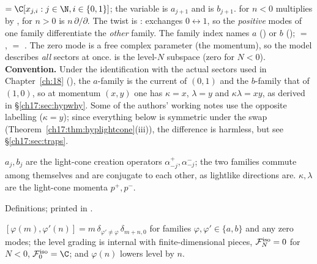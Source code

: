 \begin{dictionary}
 $=\C[x_{j,i}:j\in\N,i\in\{0,1\}]$; the variable  is $a_{j+1}$ and  is
$b_{j+1}$.   for $n<0$ multiplies by , for $n>0$ is $n\,\partial/\partial$.
The twist is :  exchanges $0\leftrightarrow1$, so the \emph{positive} modes of one family
differentiate the \emph{other} family.  The family index  names $a$ () or $b$ ();
 $=$ ,  $=$ .  The zero mode
 is a free complex parameter (the momentum), so the model describes \emph{all} sectors at once.
 is the level-$N$ subspace (zero for $N<0$).  \textbf{Convention.} Under the
identification with the actual sectors used in Chapter~\ref{ch:18} (),
the $a$-family is the current of $(0,1)$ and the $b$-family that of $(1,0)$, so at momentum $(x,y)$ one has
$\kappa=x$, $\lambda=y$ and $\kappa\lambda=xy$, as derived in \S\ref{ch17:sec:hypwhy}.  Some of the authors' working notes use the opposite
labelling ($\kappa=y$); since everything below is symmetric under the swap (Theorem~\ref{ch17:thm:hyplightcone}(iii)), the
difference is harmless, but see \S\ref{ch17:sec:traps}.
\end{dictionary}

\begin{physics}
$a_j,b_j$ are the light-cone creation operators $\alpha^+_{-j},\alpha^-_{-j}$; the two families commute among
themselves and are conjugate to each other, as lightlike directions are.  $\kappa,\lambda$ are the light-cone
momenta $p^+,p^-$.
\end{physics}

\begin{status}
Definitions; printed in .
\end{status}

\begin{theorem}\label{ch17:thm:hypheis}
$[\varphi(m),\varphi'(n)]=m\,\delta_{\varphi'\ne\varphi}\,\delta_{m+n,0}$ for families $\varphi,\varphi'\in\{a,b\}$ and any zero modes; the level
grading is internal with finite-dimensional pieces, $\mathcal{F}^{\mathrm{iso}}_N=0$ for $N<0$,
$\chseventeenF^{\mathrm{iso}}_0=\C$; and $\varphi(n)$ lowers level by $n$.
\end{theorem}

